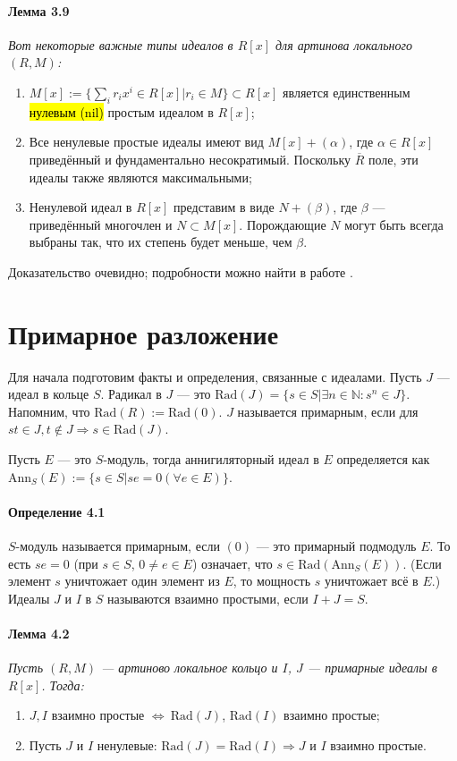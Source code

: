 \documentclass[a4paper,12pt]{article}
\newcommand{\Ann}{\text{Ann}}
\newcommand{\Rad}{\text{Rad}}
\begin{document}
\paragraph{Лемма 3.9}{\itshape
Вот некоторые важные типы идеалов в $R[x]$ для артинова локального $(R, M)$:

\renewcommand{\labelenumi}{(\asbuk{enumi})}
\begin{enumerate}
	\item $M[x] := \{\sum_i r_i x^i \in R[x] | r_i \in M \} \subset R[x]$ является единственным \hl{нулевым (nil)} простым идеалом в $R[x]$;
	\item Все ненулевые простые идеалы имеют вид $M[x] + (\alpha)$, где $\alpha \in R[x]$ приведённый и фундаментально несократимый. Поскольку $\overline{R}$ поле, эти идеалы также являются максимальными;
	\item Ненулевой идеал в $R[x]$ представим в виде $N + (\beta)$, где $\beta$ --- приведённый многочлен и $N \subset M[x]$. Порождающие $N$ могут быть всегда выбраны так, что их степень будет меньше, чем $\beta$.
\end{enumerate}
}

Доказательство очевидно; подробности можно найти в работе \cite{bib11}.

\section{Примарное разложение}
Для начала подготовим факты и определения, связанные с идеалами. Пусть $J$ --- идеал в кольце $S$.
Радикал в $J$ --- это $\Rad(J) = \{s \in S | \exists n \in \mathbb{N}: s^n \in J\}$. Напомним, что $\Rad(R) := \Rad(0)$. $J$ называется примарным, если для $s t \in J, t \notin J \Rightarrow s \in \Rad(J)$.

Пусть $E$ --- это $S$-модуль, тогда аннигиляторный идеал в $E$ определяется как $\Ann_S(E) := \{s \in S | s e = 0 (\forall e \in E)\}$.

\paragraph{Определение 4.1}
$S$-модуль называется примарным, если $(0)$ --- это примарный подмодуль $E$. То есть $s e = 0$ (при $s \in S$, $0 \ne e \in E$) означает, что $s \in \Rad(\Ann_S(E))$. (Если элемент $s$ уничтожает один элемент из $E$, то мощность $s$ уничтожает всё в $E$.) Идеалы $J$ и $I$ в $S$ называются взаимно простыми, если $I + J = S$.

\paragraph{Лемма 4.2}
{\itshape
Пусть $(R, M)$ --- артиново локальное кольцо и $I$, $J$ --- примарные идеалы в $R[x]$. Тогда:
\renewcommand{\labelenumi}{(\asbuk{enumi})}
\begin{enumerate}
	\item $J, I$ взаимно простые $\Leftrightarrow ~ \Rad(J)$, $\Rad(I)$ взаимно простые;
	\item Пусть $J$ и $I$ ненулевые: $\Rad(J) = \Rad(I) \Rightarrow J$ и $I$ взаимно простые.
\end{enumerate}
}
\end{document}
